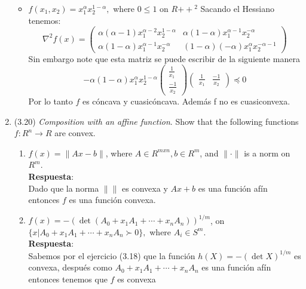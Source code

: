 \documentclass[12pt, oneside]{article}%
\begin{document}
\begin{enumerate}
\begin{itemize}
    
    \item $f(x_1,x_2) = x_1^{\alpha}x_2^{1-\alpha},$ where $0 \leq 1$ on $R{++}^2$
    Sacando el Hessiano tenemos:
    $$ \nabla^2 f(x) = \begin{pmatrix} \alpha(\alpha-1)x_1^{\alpha-2}x_2^{1-\alpha} & \alpha(1- \alpha)x_1^{\alpha-1}x_2^{-\alpha} \\ \alpha(1- \alpha)x_1^{\alpha-1}x_2^{-\alpha} & (1-\alpha) (-\alpha)x_1^{\alpha}x_2^{-\alpha-1}\end{pmatrix}$$
    Sin embargo note que esta matriz se puede escribir de la siguiente manera
    $$-\alpha(1-\alpha)x_1^\alpha x_2^{1-\alpha} \begin{pmatrix} \frac{1}{x_1} \\ \frac{-1}{x_2}\end{pmatrix}
    \begin{pmatrix} \frac{1}{x_1} & \frac{-1}{x_2} \end{pmatrix} \preceq 0$$
    Por lo tanto $f$ es cóncava y cuasicóncava. Además f no es cuasiconvexa. 
\end{itemize}

\item (3.20) \textit{Composition with an affine function}. Show that the following functions $f: R^n \rightarrow R$ are convex. 

\begin{enumerate}
    \item $f(x) = \|Ax-b\|$, where $A \in R^{mxn}, b \in R^m$, and $\|\cdot\|$ is a norm on $R^m$.\\
    \textbf{Respuesta}: \\
    Dado que la norma $\|\|$ es convexa y $Ax+b$ es una función afín entonces $f$ es una función convexa.
    
    \item $f(x) = -(\det(A_0 + x_1A_1 + \cdots + x_nA_n))^{1/m}$, on $\{x | A_0 + x_1A_1 + \cdots + x_nA_n \succ 0 \},$ where $A_i \in S^m$.\\
    \textbf{Respuesta}: \\
    Sabemos por el ejercicio (3.18) que la función $h(X)=-(\det X)^{1/m}$ es convexa, después como $A_0 + x_1A_1 + \cdots + x_nA_n$ es una función afín entonces tenemos que $f$ es convexa
    

\end{enumerate}
\end{enumerate}
\end{document}
